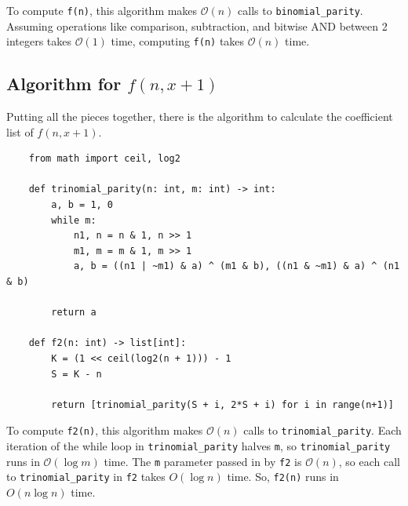 \documentclass{article}
\renewcommand{\O}{\mathcal{O}}
\begin{document}
	To compute \texttt{f(n)}, this algorithm makes $\O(n)$ calls to \texttt{binomial\_parity}.
	Assuming operations like comparison, subtraction, and bitwise AND between 2 integers takes $\O(1)$ time, computing \texttt{f(n)} takes $\O(n)$ time.

	\subsection{Algorithm for $f(n,x+1)$}
	Putting all the pieces together, there is the algorithm to calculate the coefficient list of $f(n,x+1)$.
	
	\begin{center}
	\begin{verbatim}
	from math import ceil, log2
	
	def trinomial_parity(n: int, m: int) -> int:
	    a, b = 1, 0
	    while m:
        	n1, n = n & 1, n >> 1
        	m1, m = m & 1, m >> 1
        	a, b = ((n1 | ~m1) & a) ^ (m1 & b), ((n1 & ~m1) & a) ^ (n1 & b)
	    
	    return a
	    
	def f2(n: int) -> list[int]:
	    K = (1 << ceil(log2(n + 1))) - 1
	    S = K - n
	    
	    return [trinomial_parity(S + i, 2*S + i) for i in range(n+1)]
	\end{verbatim}
	\end{center}

	To compute \texttt{f2(n)}, this algorithm makes $\O(n)$ calls to \texttt{trinomial\_parity}.
	Each iteration of the while loop in \texttt{trinomial\_parity} halves \texttt{m}, so \texttt{trinomial\_parity} runs in $\O(\log{m})$ time.
	The \texttt{m} parameter passed in by \texttt{f2} is $\O(n)$, so each call to \texttt{trinomial\_parity} in \texttt{f2} takes $O(\log{n})$ time.
	So, \texttt{f2(n)} runs in $O(n\log{n})$ time.
\end{document}
